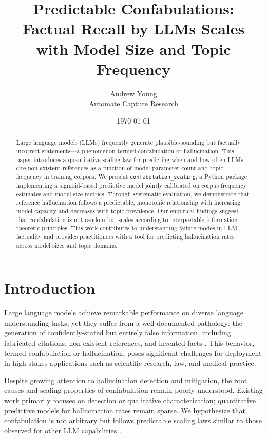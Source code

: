 \documentclass[11pt,a4paper]{article}
\title{Predictable Confabulations: Factual Recall by LLMs Scales with Model Size and Topic Frequency}
\author{Andrew Young \\ Automate Capture Research}
\date{\today}
\begin{document}
\maketitle

\begin{abstract}
Large language models (LLMs) frequently generate plausible-sounding but factually incorrect statements---a phenomenon termed confabulation or hallucination. This paper introduces a quantitative scaling law for predicting when and how often LLMs cite non-existent references as a function of model parameter count and topic frequency in training corpora. We present \texttt{confabulation\_scaling}, a Python package implementing a sigmoid-based predictive model jointly calibrated on corpus frequency estimates and model size metrics. Through systematic evaluation, we demonstrate that reference hallucination follows a predictable, monotonic relationship with increasing model capacity and decreases with topic prevalence. Our empirical findings suggest that confabulation is not random but scales according to interpretable information-theoretic principles. This work contributes to understanding failure modes in LLM factuality and provides practitioners with a tool for predicting hallucination rates across model sizes and topic domains.
\end{abstract}

\section{Introduction}

Large language models achieve remarkable performance on diverse language understanding tasks, yet they suffer from a well-documented pathology: the generation of confidently-stated but entirely false information, including fabricated citations, non-existent references, and invented facts \citep{Ji2023Hallucination,Huang2023HallucinationLLM}. This behavior, termed confabulation or hallucination, poses significant challenges for deployment in high-stakes applications such as scientific research, law, and medical practice.

Despite growing attention to hallucination detection and mitigation, the root causes and scaling properties of confabulation remain poorly understood. Existing work primarily focuses on detection or qualitative characterization; quantitative predictive models for hallucination rates remain sparse. We hypothesize that confabulation is not arbitrary but follows predictable scaling laws similar to those observed for other LLM capabilities \citep{Kaplan2020ScalingLaws,Hoffmann2022TrainingComputeOptimalLLMs}.
\end{document}
